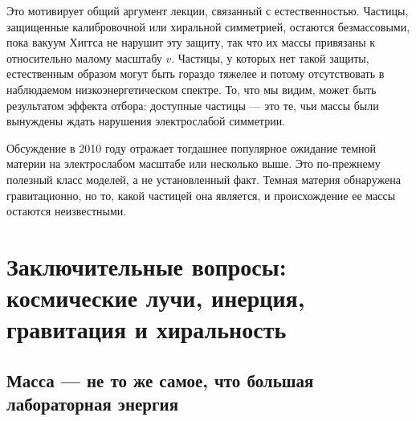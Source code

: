 Это мотивирует общий аргумент лекции, связанный с естественностью. Частицы, защищенные калибровочной или хиральной симметрией, остаются безмассовыми, пока вакуум Хиггса не нарушит эту защиту, так что их массы привязаны к относительно малому масштабу \(v\). Частицы, у которых нет такой защиты, естественным образом могут быть гораздо тяжелее и потому отсутствовать в наблюдаемом низкоэнергетическом спектре. То, что мы видим, может быть результатом эффекта отбора: доступные частицы — это те, чьи массы были вынуждены ждать нарушения электрослабой симметрии.

\begin{classroomqa}
\end{classroomqa}

Обсуждение в 2010 году отражает тогдашнее популярное ожидание темной материи на электрослабом масштабе или несколько выше. Это по-прежнему полезный класс моделей, а не установленный факт. Темная материя обнаружена гравитационно, но то, какой частицей она является, и происхождение ее массы остаются неизвестными.

\section{Заключительные вопросы: космические лучи, инерция, гравитация и хиральность}

\subsection{Масса — не то же самое, что большая лабораторная энергия}

\begin{classroomqa}
\end{classroomqa}

